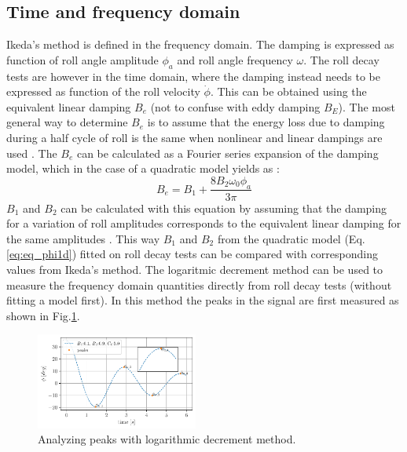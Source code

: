 \subsection*{Time and frequency domain}\label{time-and-frequency-domain}
\label{se:time_and_frequency} Ikeda's method is defined in the
frequency domain. The damping is expressed as function of roll angle
amplitude $\phi_a$ and roll angle frequency $\omega$. The roll decay
tests are however in the time domain, where the damping instead needs to
be expressed as function of the roll velocity $\dot{\phi}$. This can
be obtained using the equivalent linear damping $B_e$ (not to confuse
with eddy damping $B_E$). The most general way to determine $B_e$ is
to assume that the energy loss due to damping during a half cycle of
roll is the same when nonlinear and linear dampings are used
\citep{7505983/RYUBZITQ}. The $B_e$ can be calculated as a Fourier
series expansion of the damping model, which in the case of a quadratic
model yields as \citep{7505983/FB64RGPF}:
\begin{equation}
B_{e} = B_{1} + \frac{8 B_{2} \omega_{0} \phi_{a}}{3 \pi}
\label{eq:B_e_equation}
\end{equation}
$B_1$ and $B_2$ can be calculated with this equation by assuming
that the damping for a variation of roll amplitudes corresponds to the
equivalent linear damping for the same amplitudes
\citep{7505983/FB64RGPF}. This way $B_1$ and $B_2$ from the quadratic
model (Eq.\ref{eq:eq_phi1d}) fitted on roll decay tests can be
compared with corresponding values from Ikeda's method. The logaritmic
decrement method \citep{7505983/BYNJ8CFG} can be used to measure the
frequency domain quantities directly from roll decay tests (without
fitting a model first). In this method the peaks in the signal are first
measured as shown in Fig.\ref{fig:peaks}.
\begin{figure}[H]
\begin{center}\includegraphics[width = 0.475\textwidth]{figures/peaks.pdf}\end{center}
\vspace{-0.7cm}
\caption{Analyzing peaks with logarithmic decrement method.}
\label{fig:peaks}
\end{figure}
